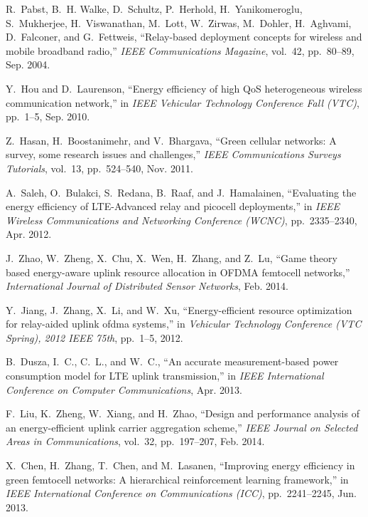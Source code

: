 \documentclass[draftcls,onecolumn]{IEEEtran}
\theoremstyle{plain}
\theoremstyle{definition}
\begin{document}
\begin{thebibliography}{10}

R.~Pabst, B.~H. Walke, D.~Schultz, P.~Herhold, H.~Yanikomeroglu, S.~Mukherjee,
  H.~Viswanathan, M.~Lott, W.~Zirwas, M.~Dohler, H.~Aghvami, D.~Falconer, and
  G.~Fettweis, ``Relay-based deployment concepts for wireless and mobile
  broadband radio,'' {\em IEEE Communications Magazine}, vol.~42, pp.~80--89,
  Sep. 2004.

Y.~Hou and D.~Laurenson, ``Energy efficiency of high {Q}o{S} heterogeneous
  wireless communication network,'' in {\em IEEE Vehicular Technology
  Conference Fall (VTC)}, pp.~1--5, Sep. 2010.

Z.~Hasan, H.~Boostanimehr, and V.~Bhargava, ``Green cellular networks: A
  survey, some research issues and challenges,'' {\em IEEE Communications
  Surveys Tutorials}, vol.~13, pp.~524--540, Nov. 2011.

A.~Saleh, O.~Bulakci, S.~Redana, B.~Raaf, and J.~Hamalainen, ``Evaluating the
  energy efficiency of {LTE}-{A}dvanced relay and picocell deployments,'' in
  {\em IEEE Wireless Communications and Networking Conference (WCNC)},
  pp.~2335--2340, Apr. 2012.

J.~Zhao, W.~Zheng, X.~Chu, X.~Wen, H.~Zhang, and Z.~Lu, ``Game theory based
  energy-aware uplink resource allocation in {OFDMA} femtocell networks,'' {\em
  International Journal of Distributed Sensor Networks}, Feb. 2014.

Y.~Jiang, J.~Zhang, X.~Li, and W.~Xu, ``Energy-efficient resource optimization
  for relay-aided uplink ofdma systems,'' in {\em Vehicular Technology
  Conference (VTC Spring), 2012 IEEE 75th}, pp.~1--5, 2012.

B.~Dusza, I.~C., C.~L., and W.~C., ``An accurate measurement-based power
  consumption model for {LTE} uplink transmission,'' in {\em IEEE International
  Conference on Computer Communications}, Apr. 2013.

F.~Liu, K.~Zheng, W.~Xiang, and H.~Zhao, ``Design and performance analysis of
  an energy-efficient uplink carrier aggregation scheme,'' {\em IEEE Journal on
  Selected Areas in Communications}, vol.~32, pp.~197--207, Feb. 2014.

X.~Chen, H.~Zhang, T.~Chen, and M.~Lasanen, ``Improving energy efficiency in
  green femtocell networks: A hierarchical reinforcement learning framework,''
  in {\em IEEE International Conference on Communications (ICC)},
  pp.~2241--2245, Jun. 2013.


\end{thebibliography}
\end{document}
